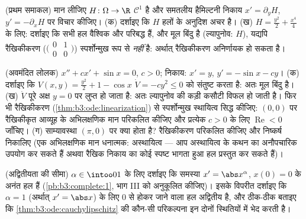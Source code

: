 \begin{exercise}[$\star\star$]\label{exo:b3:ode:7}
(प्रथम समाकल) मान लीजिए $H \colon \Omega \to \R$ $\mathcal
C^1$ है और समतलीय हैमिल्टनी निकाय
$x' =
\partial_yH$, $y' = -\partial_xH$ पर विचार कीजिए।
(क) दर्शाइए कि $H$ हलों के अनुदिश अचर है।
(ख) $H = \frac{y^2}2 + \frac{x^4}4$ के लिए: दर्शाइए कि सभी हल वैश्विक और परिबद्ध हैं, और
मूल बिंदु  है (ल्यापुनोव: $H$), यद्यपि रैखिकीकरण ($\bigl(\begin{smallmatrix}0&1\\0&0\end{smallmatrix}\bigr)$)
स्पर्शोन्मुख रूप से  \emph{नहीं} है: अर्थात् रैखिकीकरण
अनिर्णायक हो सकता है।
\end{exercise}

\begin{exercise}[$\star\star\star$]\label{exo:b3:ode:8}
(अवमंदित लोलक) $x'' + cx' + \sin x = 0$, $c > 0$; निकाय: $x' = y$, $y' = -\sin x - cy$।
(क) दर्शाइए कि $V(x, y) = \frac{y^2}2 + 1 - \cos x$ $\dot
V = -cy^2 \leq 0$ को संतुष्ट करता है: अतः मूल बिंदु
 है।
(ख) $\dot V$ पूरे अक्ष $y = 0$ पर लुप्त हो जाता है: अतः ल्यापुनोव की
कड़ी कसौटी विफल हो जाती है। फिर भी रैखिकीकरण (\cref{thm:b3:ode:linearization}) से
स्पर्शोन्मुख स्थायित्व सिद्ध कीजिए: $(0,0)$ पर रैखिकीकृत आव्यूह के
अभिलक्षणिक मान परिकलित कीजिए और प्रत्येक $c > 0$ के लिए $\operatorname{Re} < 0$
जाँचिए।
(ग) साम्यावस्था $(\pi, 0)$ पर क्या होता है? रैखिकीकरण परिकलित कीजिए
और निष्कर्ष निकालिए (एक अभिलक्षणिक मान धनात्मक: अस्थायित्व ---
आप अस्थायित्व के कथन का अनौपचारिक उपयोग कर सकते हैं अथवा रैखिक
निकाय का कोई स्पष्ट भागता हुआ हल प्रस्तुत कर सकते हैं)।
\end{exercise}

\begin{exercise}[$\star\star$]\label{exo:b3:ode:9}
(अद्वितीयता की सीमा) $\alpha \in \intoo01$ के लिए दर्शाइए कि समस्या $x' = \abs x^{\alpha}$, $x(0) = 0$
के अनंत हल हैं (\cref{pb:b3:complete:1}, भाग III को अनुकूलित कीजिए)। इसके विपरीत
दर्शाइए कि $\alpha = 1$ (अर्थात् $x' = \abs
x$) के लिए $0$ से होकर जाने वाला
हल अद्वितीय है, और ठीक-ठीक बताइए कि \cref{thm:b3:ode:cauchylipschitz} की कौन-सी परिकल्पना इन
दोनों स्थितियों में भेद करती है।
\end{exercise}

